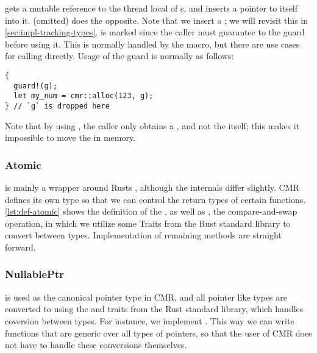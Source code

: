 \begin{figure}

\end{figure}

 gets a mutable reference to the thread local  of s,
and inserts a pointer to itself into it.  (omitted) does the opposite.
Note that we insert a ; we will revisit this in \cref{sec:impl-tracking-types}.
 is marked  since the caller must guarantee to  the
guard before using it. This is normally handled by the  macro, but there are use cases
for calling  directly. Usage of the guard is normally as follows:
\begin{lstlisting}[style=Rust]
{
  guard!(g);
  let my_num = cmr::alloc(123, g);
} // `g` is dropped here
\end{lstlisting}
Note that by using , the caller only obtains a , and not the
 itself; this makes it impossible to move the  in memory.


\subsubsection{Atomic}

 is mainly a wrapper around Rusts , although the internals differ
slightly. CMR defines its own type so that we can control the return types of certain functions.
\cref{lst:def-atomic} shows the definition of the , as well as , the
compare-and-swap operation, in which we utilize some Traits from the Rust standard library to
convert between types.  Implementation of remaining methods are straight forward.




\subsubsection{NullablePtr}

 is used as the canonical pointer type in CMR, and all pointer like types are
converted to  using the  and  traits from the Rust standard
library, which handles coversion between types. For instance, we implement . This way we can write functions that are generic over all types of pointers, so
that the user of CMR does not have to handle these conversions themselves.


